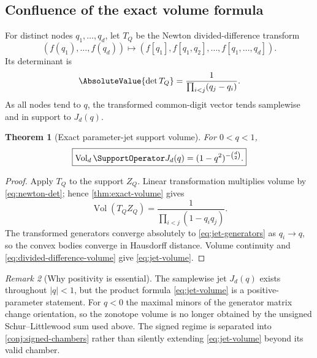 \documentclass[11pt,a4paper]{article}
\newtheorem{theorem}{Theorem}[section]
\theoremstyle{definition}
\theoremstyle{remark}
\newtheorem{remark}[theorem]{Remark}
\newcommand{\Vol}{\operatorname{Vol}}
\begin{document}
\subsection{Confluence of the exact volume formula}

For distinct nodes $q_1,\ldots,q_d$, let $T_Q$ be the Newton divided-difference transform
\begin{equation}
  (f(q_1),\ldots,f(q_d))
   \longmapsto
  (f[q_1],f[q_1,q_2],\ldots,f[q_1,\ldots,q_d]).
  \label{eq:newton-transform}
\end{equation}
Its determinant is
\begin{equation}
  \AbsoluteValue{\det T_Q}
   =\frac1{\prod_{i<j}(q_j-q_i)}.
  \label{eq:newton-det}
\end{equation}
As all nodes tend to $q$, the transformed common-digit vector tends samplewise and in support to $J_d(q)$.

\begin{theorem}[Exact parameter-jet support volume]
\label{thm:jet-volume}
For $0<q<1$,
\begin{equation}
 \boxed{
  \Vol_d\SupportOperator J_d(q)
   =(1-q^2)^{-\binom d2}.}
 \label{eq:jet-volume}
\end{equation}
\end{theorem}

\begin{proof}
Apply $T_Q$ to the support $Z_Q$.  Linear transformation multiplies volume by \eqref{eq:newton-det}; hence \cref{thm:exact-volume} gives
\begin{equation}
  \Vol(T_QZ_Q)
   =\frac1{\prod_{i<j}(1-q_iq_j)}.
  \label{eq:divided-difference-volume}
\end{equation}
The transformed generators converge absolutely to \eqref{eq:jet-generators} as $q_i\to q$, so the convex bodies converge in Hausdorff distance.  Volume continuity and \eqref{eq:divided-difference-volume} give \eqref{eq:jet-volume}.
\end{proof}

\begin{remark}[Why positivity is essential]
The samplewise jet $J_d(q)$ exists throughout $|q|<1$, but the product formula
\eqref{eq:jet-volume} is a positive-parameter statement.  For $q<0$ the
maximal minors of the generator matrix change orientation, so the zonotope
volume is no longer obtained by the unsigned Schur--Littlewood sum used above.
The signed regime is separated into \cref{conj:signed-chambers} rather than
silently extending \eqref{eq:jet-volume} beyond its valid chamber.
\end{remark}
\end{document}
